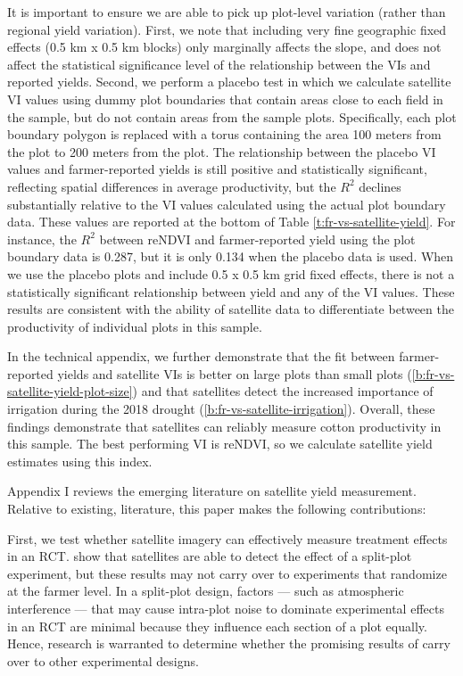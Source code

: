 \documentclass{article}
\begin{document}
It is important to ensure we are able to pick up plot-level variation (rather than regional yield variation). First, we note that including very fine geographic fixed effects (0.5 km x 0.5 km blocks) only marginally affects the slope, and does not affect the statistical significance level of the relationship between the VIs and reported yields. Second, we perform a placebo test in which we calculate satellite VI values using dummy plot boundaries that contain areas close to each field in the sample, but do not contain areas from the sample plots. Specifically, each plot boundary polygon is replaced with a torus containing the area 100 meters from the plot to 200 meters from the plot. The relationship between the placebo VI values and farmer-reported yields is still positive and statistically significant, reflecting spatial differences in average productivity, but the $R^2$ declines substantially relative to the VI values calculated using the actual plot boundary data. These values are reported at the bottom of Table \ref{t:fr-vs-satellite-yield}. For instance, the $R^2$ between reNDVI and farmer-reported yield using the plot boundary data is 0.287, but it is only 0.134 when the placebo data is used. When we use the placebo plots and include 0.5 x 0.5 km grid fixed effects, there is not a statistically significant relationship between yield and any of the VI values. These results are consistent with the ability of satellite data to differentiate between the productivity of individual plots in this sample.

In the technical appendix, we further demonstrate that the fit between farmer-reported yields and satellite VIs is better on large plots than small plots (\ref{b:fr-vs-satellite-yield-plot-size}) and that satellites detect the increased importance of irrigation during the 2018 drought (\ref{b:fr-vs-satellite-irrigation}). Overall, these findings demonstrate that satellites can reliably measure cotton productivity in this sample. The best performing VI is reNDVI, so we calculate satellite yield estimates using this index. 

Appendix I reviews the emerging literature on satellite yield measurement. Relative to existing, literature, this paper makes the following contributions: 

First, we test whether satellite imagery can effectively measure treatment effects in an RCT. \citet{Jain2019TheData} show that satellites are able to detect the effect of a split-plot experiment, but these results may not carry over to experiments that randomize at the farmer level. In a split-plot design, factors — such as atmospheric interference — that may cause intra-plot noise to dominate experimental effects in an RCT are minimal because they influence each section of a plot equally. Hence, research is warranted to determine whether the promising results of \citet{Jain2019TheData} carry over to other experimental designs. 
\end{document}
